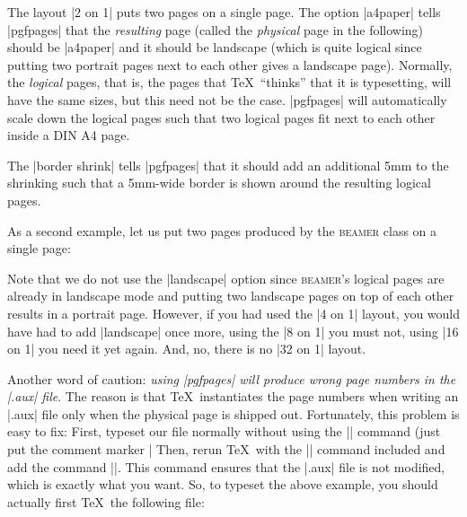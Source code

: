The layout |2 on 1| puts two pages on a single page. The option
|a4paper| tells |pgfpages| that the \emph{resulting} page (called the
\emph{physical} page in the following) should be |a4paper| and it
should be landscape (which is quite logical since putting two portrait
pages next to each other gives a landscape page). Normally, the
\emph{logical} pages, that is, the pages that \TeX\ ``thinks'' that it
is typesetting, will have the same sizes, but this need not be the
case. |pgfpages| will automatically scale down the logical pages such
that two logical pages fit next to each other inside a DIN A4 page.

The |border shrink| tells |pgfpages| that it should add an additional
5mm to the shrinking such that a 5mm-wide border is shown around the
resulting logical pages.

As a second example, let us put two pages produced by the
\textsc{beamer} class on a single page:


Note that we do not use the |landscape| option since \textsc{beamer}'s
logical pages are already in landscape mode and putting two landscape
pages on top of each other results in a portrait page. However, if you
had used the |4 on 1| layout, you would have had to add |landscape|
once more, using the |8 on 1| you must not, using |16 on 1| you need
it yet again. And, no, there is no |32 on 1| layout.

Another word of caution: \emph{using |pgfpages| will produce wrong
  page numbers in the |.aux| file}. The reason is that \TeX\
instantiates the page numbers when writing an |.aux| file only when
the physical page is shipped out. Fortunately, this problem is easy to
fix: First, typeset our file normally without using the
|\pgfpagesuselayout| command (just put the comment marker |%
Then, rerun \TeX\ with the |\pgfpagesuselayout| command included and add
the command |\nofiles|. This command ensures that the |.aux| file is
not modified, which is exactly what you want. So, to typeset the above
example, you should actually first \TeX\ the following file:

